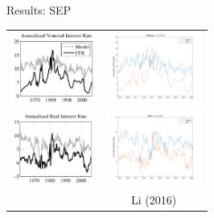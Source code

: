 \documentclass{beamer}
\begin{document}
\begin{frame}{Results: SEP}
\begin{center}
\begin{tabular}{cc}
\includegraphics[height=90px]{figs/implied_ffr/nominal_1_collard.png} &
\includegraphics[height=90px]{figs/implied_ffr/nominal_1.png} \\
\includegraphics[height=90px]{figs/implied_ffr/real_1_collard.png} &
\includegraphics[height=90px]{figs/implied_ffr/real_1.png} \\
\cite{collard11} & Li (2016)
\end{tabular}
\end{center}
\end{frame}
\end{document}

